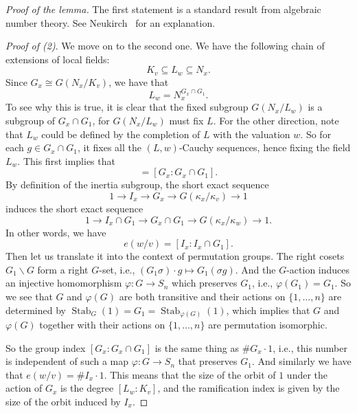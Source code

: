 \documentclass{amsart}
\numberwithin{equation}{section}
\theoremstyle{plain}
\theoremstyle{definition}
\theoremstyle{remark}
\begin{document}
\begin{proof}[Proof of the lemma]
    The first statement is a standard result from algebraic number theory.
    See Neukirch~\cite[p.54-55]{neukirch2013algebraic} for an explanation.

    \emph{Proof of (2)}.    
        We move on to the second one.
        We have the following chain of extensions of local fields:
        \begin{equation*}
            K_{v}\subseteq L_{w}\subseteq N_{x}.
	\end{equation*}
	Since $G_{x}\cong G(N_{x}/K_{v})$, we have that
	\begin{equation*}
		L_{w}=N_{x}^{G_{x}\cap G_1}.
	\end{equation*}
	To see why this is true, it is clear that the fixed subgroup $G(N_{x}/L_{w})$ is a subgroup of $G_{x}\cap G_1$, for $G(N_{x}/L_{w})$ must fix $L$.
	For the other direction, note that $L_{w}$ could be defined by the completion of $L$ with the valuation $w$.
	So for each $g\in G_{x}\cap G_1$, it fixes all the $(L,w)$-Cauchy sequences, hence fixing the field $L_{w}$.
	This first implies that
	\begin{equation*}
		[L_{w}:K_{v}]=[G_{x}:G_{x}\cap G_1].
	\end{equation*}
	By definition of the inertia subgroup, the short exact sequence
	\begin{equation*}
		1\to I_{x}\to G_{x}\to G(\kappa_{x}/\kappa_{v})\to 1
	\end{equation*}
	induces the short exact sequence
	\begin{equation*}
		1\to  I_{x}\cap G_1\to G_{x}\cap G_1\to G(\kappa_{x}/\kappa_{w})\to 1.
	\end{equation*}
	In other words, we have
	\begin{equation*}
		e(w/v)=[I_{x}:I_{x}\cap G_1].
	\end{equation*}
	Then let us translate it into the context of permutation groups.
	The right cosets $G_1\backslash G$ form a right $G$-set, i.e., $(G_1\sigma)\cdot g\mapsto G_1(\sigma g)$.
	And the $G$-action induces an injective homomorphism $\varphi:G\to S_n$ which preserves $G_1$, i.e., $\varphi(G_1)=G_1$.
	So we see that $G$ and $\varphi(G)$ are both transitive and their actions on $\{1,\dots,n\}$ are determined by $\operatorname{Stab}_G(1)=G_1=\operatorname{Stab}_{\varphi(G)}(1)$, 
    which implies that $G$ and $\varphi(G)$ together with their actions on $\{1,\dots,n\}$ are permutation isomorphic.
		
	So the group index $[G_{x}:G_{x}\cap G_1]$ is the same thing as $\#  G_{x}\cdot1$,
	i.e., this number is independent of such a map $\varphi:G\to S_n$ that preserves $G_1$.
	And similarly we have that $e(w/v)=\# I_{x}\cdot 1$.
	This means that the size of the orbit of $1$ under the action of $G_{x}$ is the degree $[L_{w}:K_{v}]$, and the ramification index is given by the size of the orbit induced by $I_{x}$.
    

\end{proof}
\end{document}
